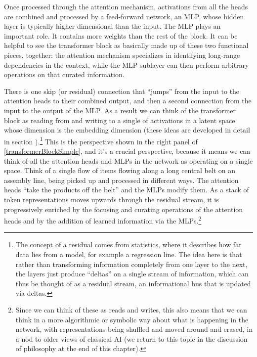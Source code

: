 Once processed through the attention mechanism, activations from all the heads are combined and processed by a
feed-forward network, an MLP, whose hidden layer is typically higher
dimensional than the input. The MLP plays an important role. It contains more
weights than the rest of the block. It can be helpful to see the transformer
block as basically made up of these two functional pieces, together: the
attention mechanism specializes in identifying long-range dependencies in the
context, while the MLP sublayer can then
perform arbitrary operations on that curated information.  

There is one skip (or residual) connection that ``jumps'' from the input to the attention heads to their combined output, and then a second connection from the input to the output of the MLP. As a result we can think of the transformer block as reading
from and writing to a single  of activations in a
latent space \cite{elhage2021mathematical, milliere2024philosophical2} whose
dimension is the embedding dimension (these ideas are developed in detail in section
).\footnote{The concept of a residual comes from statistics, where it describes how far data lies from a model, for example a regression line. The idea
here is that rather than transforming information completely from one layer to
the next,  the layers just produce ``deltas'' on a single stream of
information, which can thus be thought of as a residual stream, an informational bus that is updated via deltas.} This is the
perspective shown in the right panel of \ref{transformerBlockSimple}, and it's
a crucial perspective, because it means we can think of all the attention heads and MLPs in the network as operating on a single space. Think of a single flow of items flowing along a long central belt on an assembly line, being picked up and processed in different ways. The attention heads ``take the products off the belt'' and the MLPs modify them. As a stack of token representations moves upwards through the
residual stream, it is progressively enriched by the focusing and curating operations of the attention heads and by the addition of learned information via the MLPs.\footnote{Since we can think of these as reads and writes, this
also means that we can think in a more algorithmic or symbolic way about what
is happening in the network, with representations being shuffled and moved
around and erased, in a nod to older views of classical AI (we return to
this topic in the discussion of philosophy at the end of this chapter).} 

